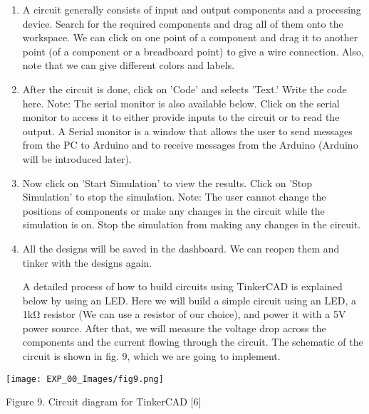 \documentclass[12pt,a4paper]{article}
\begin{document}
\begin{justify}
\begin{enumerate}
\begin{center} 
\texttt{[image: EXP\_00\_Images/fig8.png]}
\end{center}
\vspace{-8mm}
\begin{center} {Figure 8. Workspace of TinkerCAD circuits }\end{center}

\item A circuit generally consists of input and output components and a processing device. Search for the required components and drag all of them onto the workspace. We can click on one point of a component and drag it to another point (of a component or a breadboard point) to give a wire connection. Also, note that we can give different colors and labels.
\item After the circuit is done, click on 'Code' and selects 'Text.' Write the code here. Note: The serial monitor is also available below. Click on the serial monitor to access it to either provide inputs to the circuit or to read the output. A Serial monitor is a window that allows the user to send messages from the PC to Arduino and to receive messages from the Arduino (Arduino will be introduced later).
\item Now click on 'Start Simulation' to view the results. Click on 'Stop Simulation' to stop the simulation. Note: The user cannot change the positions of components or make any changes in the circuit while the simulation is on. Stop the simulation from making any changes in the circuit.
\item All the designs will be saved in the dashboard. We can reopen them and tinker with the designs again.\par

\noindent A detailed process of how to build circuits using TinkerCAD is explained below by using an LED. Here we will build a simple circuit using an LED, a 1kΩ resistor (We can use a resistor of our choice), and power it with a 5V power source. After that, we will measure the voltage drop across the components and the current flowing through the circuit. The schematic of the circuit is shown in fig. 9, which we are going to implement.

\end{enumerate}

\begin{center} 
\texttt{[image: EXP\_00\_Images/fig9.png]}
\end{center}
\vspace{-8mm}
\begin{center} {Figure 9. Circuit diagram for TinkerCAD [6] }\end{center}



\end{justify}
\end{document}
